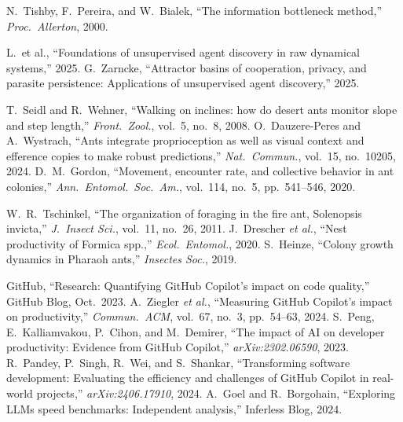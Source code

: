 \documentclass[10pt,conference]{IEEEtran}
\begin{document}

\begin{thebibliography}{25}
 N.~Tishby, F.~Pereira, and W.~Bialek, ``The information bottleneck method,'' \emph{Proc.\ Allerton}, 2000.

 L.~et al., ``Foundations of unsupervised agent discovery in raw dynamical systems,'' 2025.
 G.~Zarncke, ``Attractor basins of cooperation, privacy, and parasite persistence: Applications of unsupervised agent discovery,'' 2025.

 T.~Seidl and R.~Wehner, ``Walking on inclines: how do desert ants monitor slope and step length,'' \emph{Front.\ Zool.}, vol.~5, no.~8, 2008.
 O.~Dauzere-Peres and A.~Wystrach, ``Ants integrate proprioception as well as visual context and efference copies to make robust predictions,'' \emph{Nat.\ Commun.}, vol.~15, no.~10205, 2024.
 D.~M.~Gordon, ``Movement, encounter rate, and collective behavior in ant colonies,'' \emph{Ann.\ Entomol.\ Soc.\ Am.}, vol.~114, no.~5, pp.~541--546, 2020.

 W.~R.~Tschinkel, ``The organization of foraging in the fire ant, Solenopsis invicta,'' \emph{J.\ Insect Sci.}, vol.~11, no.~26, 2011.
 J.~Drescher \emph{et al.}, ``Nest productivity of Formica spp.,'' \emph{Ecol.\ Entomol.}, 2020.
 S.~Heinze, ``Colony growth dynamics in Pharaoh ants,'' \emph{Insectes Soc.}, 2019.

 GitHub, ``Research: Quantifying GitHub Copilot's impact on code quality,'' GitHub Blog, Oct.~2023.
 A.~Ziegler \emph{et al.}, ``Measuring GitHub Copilot's impact on productivity,'' \emph{Commun.\ ACM}, vol.~67, no.~3, pp.~54--63, 2024.
 S.~Peng, E.~Kalliamvakou, P.~Cihon, and M.~Demirer, ``The impact of AI on developer productivity: Evidence from GitHub Copilot,'' \emph{arXiv:2302.06590}, 2023.
 R.~Pandey, P.~Singh, R.~Wei, and S.~Shankar, ``Transforming software development: Evaluating the efficiency and challenges of GitHub Copilot in real-world projects,'' \emph{arXiv:2406.17910}, 2024.
 A.~Goel and R.~Borgohain, ``Exploring LLMs speed benchmarks: Independent analysis,'' Inferless Blog, 2024.


\end{thebibliography}
\end{document}
